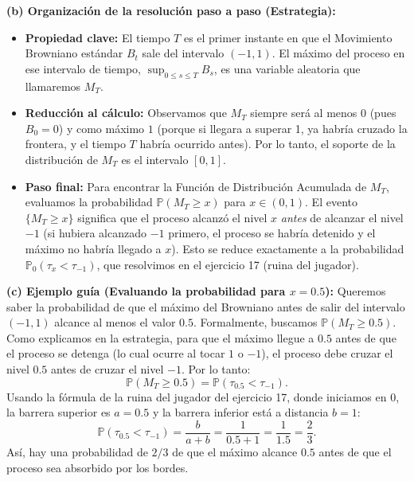 \documentclass[11pt, letterpaper]{article}
\begin{document}
\begin{solucion}
    \textbf{(b) Organización de la resolución paso a paso (Estrategia):}
    \begin{itemize}
        \item[(i)] \textbf{Propiedad clave:} El tiempo $T$ es el primer instante en que el Movimiento Browniano estándar $B_t$ sale del intervalo $(-1, 1)$. El máximo del proceso en ese intervalo de tiempo, $\sup_{0 \le s \le T} B_s$, es una variable aleatoria que llamaremos $M_T$.
        \item[(ii)] \textbf{Reducción al cálculo:} Observamos que $M_T$ siempre será al menos $0$ (pues $B_0 = 0$) y como máximo $1$ (porque si llegara a superar 1, ya habría cruzado la frontera, y el tiempo $T$ habría ocurrido antes). Por lo tanto, el soporte de la distribución de $M_T$ es el intervalo $[0, 1]$.
        \item[(iii)] \textbf{Paso final:} Para encontrar la Función de Distribución Acumulada de $M_T$, evaluamos la probabilidad $\mathbb{P}(M_T \ge x)$ para $x \in (0, 1)$. El evento $\{M_T \ge x\}$ significa que el proceso alcanzó el nivel $x$ \textit{antes} de alcanzar el nivel $-1$ (si hubiera alcanzado $-1$ primero, el proceso se habría detenido y el máximo no habría llegado a $x$). Esto se reduce exactamente a la probabilidad $\mathbb{P}_0(\tau_x < \tau_{-1})$, que resolvimos en el ejercicio 17 (ruina del jugador).
    \end{itemize}

    \vspace{3mm}
    \textbf{(c) Ejemplo guía (Evaluando la probabilidad para $x=0.5$):}
    Queremos saber la probabilidad de que el máximo del Browniano antes de salir del intervalo $(-1, 1)$ alcance al menos el valor $0.5$.
    Formalmente, buscamos $\mathbb{P}(M_T \ge 0.5)$.
    Como explicamos en la estrategia, para que el máximo llegue a $0.5$ antes de que el proceso se detenga (lo cual ocurre al tocar $1$ o $-1$), el proceso debe cruzar el nivel $0.5$ antes de cruzar el nivel $-1$.
    Por lo tanto:
    \[ \mathbb{P}(M_T \ge 0.5) = \mathbb{P}(\tau_{0.5} < \tau_{-1}). \]
    Usando la fórmula de la ruina del jugador del ejercicio 17, donde iniciamos en $0$, la barrera superior es $a = 0.5$ y la barrera inferior está a distancia $b = 1$:
    \[ \mathbb{P}(\tau_{0.5} < \tau_{-1}) = \frac{b}{a+b} = \frac{1}{0.5 + 1} = \frac{1}{1.5} = \frac{2}{3}. \]
    Así, hay una probabilidad de $2/3$ de que el máximo alcance $0.5$ antes de que el proceso sea absorbido por los bordes.


\end{solucion}
\end{document}
